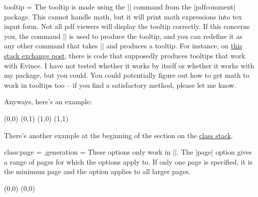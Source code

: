 \begin{sseqdata}[|| name = ex1, cohomological Serre grading]
\begin{key}{tooltip = }
The tooltip is made using the |\pdftooltip| command from the |pdfcomment| package. This cannot handle math, but it will print math expressions into tex input form. Not all pdf viewers will display the tooltip correctly. If this concerns you, the command |\sseqtooltip| is used to produce the tooltip, and you can redefine it as any other command that takes |\sseqtooltip| and produces a tooltip. For instance, on \href{https://tex.stackexchange.com/a/164186/23866}{this stack exchange post}, there is code that supposedly produces tooltips that work with Evince. I have not tested whether it works by itself or whether it works with my package, but you could. You could potentially figure out how to get math to work in tooltips too -- if you find a satisfactory method, please let me know.

Anyways, here's an example:
\begin{codeexample}[]
\begin{sseqpage}[classes = {tooltip = {(\xcoord,\ycoord)}}]
\class(0,0)
\class(0,1)
\class(1,0)
\class(1,1)
\end{sseqpage}
\end{codeexample}

There's another example at the beginning of the section on the \hyperref[sec:class stack]{class stack}.
\end{key}

\begin{keylist}{class:page = ,generation = }
These options only work in |\classoptions|. The |page| option gives a range of pages for which the options apply to. If only one page is specified, it is the minimum page and the option applies to all larger pages.
\begin{codeexample}[width = 6cm]
\begin{sseqdata}[ name = page_example, no axes,
    title = \page, title style = {yshift = -0.5cm} ]
\class(0,0)
\classoptions[class:page = {2--3},fill,blue](0,0)
\end{sseqdata}


\end{codeexample}
\end{keylist}
\end{sseqdata}
